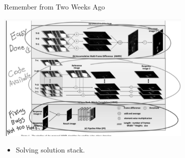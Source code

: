 




\begin{frame}{Remember from Two Weeks Ago}
    \begin{center}
        \includegraphics[height=0.7\textheight,width=0.7\textwidth,keepaspectratio]{images/baboon/old.jpg}
    \end{center}
    \begin{itemize}
        \item Solving solution stack.
    \end{itemize}
\end{frame}

